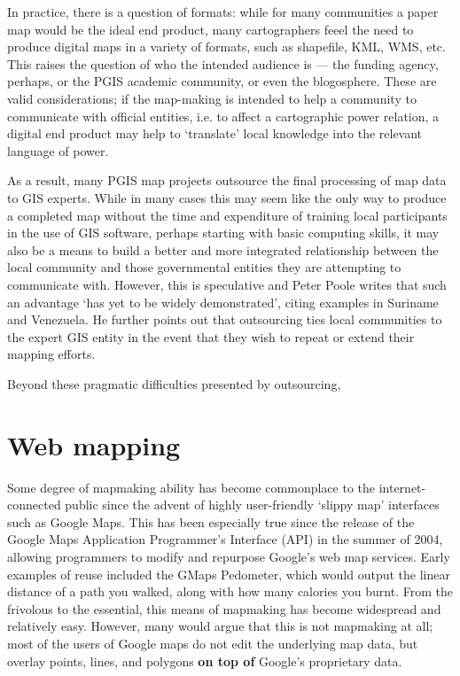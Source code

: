 \documentclass[11pt,oneside,notitlepage]{report}
\begin{document}
In practice, there is a question of formats: while for many communities a paper map would be the ideal end product, many cartographers feeel the need to produce digital maps in a variety of formats, such as shapefile, KML, WMS, etc. This raises the question of who the intended audience is --- the funding agency, perhaps, or the PGIS academic community, or even the blogosphere. These are valid considerations; if the map-making is intended to help a community to communicate with official entities, i.e. to affect a cartographic power relation, a digital end product may help to `translate' local knowledge into the relevant language of power. 

As a result, many PGIS map projects outsource the final processing of map data to GIS experts. While in many cases this may seem like the only way to produce a completed map without the time and expenditure of training local participants in the use of GIS software, perhaps starting with basic computing skills, it may also be a means to build a better and more integrated relationship between the local community and those governmental entities they are attempting to communicate with. However, this is speculative and Peter Poole writes that such an advantage `has yet to be widely demonstrated', citing examples in Suriname and Venezuela. He further points out that outsourcing ties local communities to the expert GIS entity in the event that they wish to repeat or extend their mapping efforts. \cite{poole2006there}

Beyond these pragmatic difficulties presented by outsourcing,  

\section{Web mapping}
\label{sec:webmapping}
Some degree of mapmaking ability has become commonplace to the internet-connected public since the advent of highly user-friendly `slippy map' interfaces such as Google Maps. This has been especially true since the release of the Google Maps Application Programmer's Interface (API) in the summer of 2004, allowing programmers to modify and repurpose Google's web map services.  Early examples of reuse included the GMaps Pedometer, which would output the linear distance of a path you walked, along with how many calories you burnt. \cite{gibson2006google} From the frivolous to the essential, this means of mapmaking has become widespread and relatively easy. However, many would argue that this is not mapmaking at all; most of the users of Google maps do not edit the underlying map data, but overlay points, lines, and polygons \textbf{on top of} Google's proprietary data.
\end{document}
